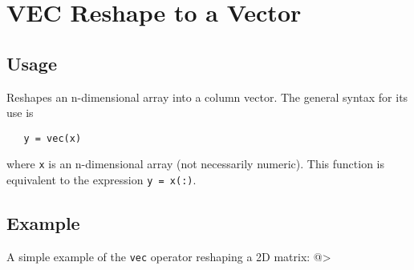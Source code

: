 \section{VEC Reshape to a Vector}

\subsection{Usage}

Reshapes an n-dimensional array into a column vector.  The general
syntax for its use is
\begin{verbatim}
   y = vec(x)
\end{verbatim}
where \verb|x| is an n-dimensional array (not necessarily numeric).  This
function is equivalent to the expression \verb|y = x(:)|.
\subsection{Example}

A simple example of the \verb|vec| operator reshaping a 2D matrix:
@>

